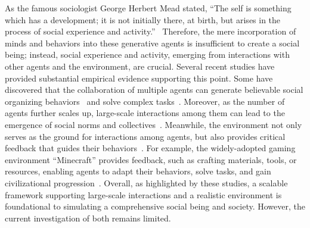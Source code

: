 As the famous sociologist George Herbert Mead stated, ``The self is something which has a development; it is not initially there, at birth, but arises in the process of social experience and activity.''~\cite{mead1934mind} Therefore, the mere incorporation of minds and behaviors into these generative agents is insufficient to create a social being; instead, social experience and activity, emerging from interactions with other agents and the environment, are crucial. Several recent studies have provided substantial empirical evidence supporting this point. Some have discovered that the collaboration of multiple agents can generate believable social organizing behaviors~\cite{park2023generative} and solve complex tasks~\cite{li2023camel,cheng2024sociodojo}. Moreover, as the number of agents further scales up, large-scale interactions among them can lead to the emergence of social norms and collectives~\cite{lai2024evolving,piao2025emergence}. Meanwhile, the environment not only serves as the ground for interactions among agents, but also provides critical feedback that guides their behaviors~\cite{al2024project,li2024econagent,wang2023voyager,zhu2023ghost}. For example, the widely-adopted gaming environment ``Minecraft'' provides feedback, such as crafting materials, tools, or resources, enabling agents to adapt their behaviors, solve tasks, and gain civilizational progression~\cite{wang2023voyager,zhu2023ghost,al2024project}. Overall, as highlighted by these studies, a scalable framework supporting large-scale interactions and a realistic environment is foundational to simulating a comprehensive social being and society. However, the current investigation of both remains limited.




